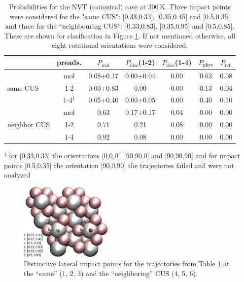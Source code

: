 \documentclass[11pt,DIV=13,BCOR=5mm,a4paper,headinclude]{scrbook}
\begin{document}
\begin{table}[hbt]
 \centering
  \caption{
  Probabilities for the NVT (canonical) case at $300\,$K.
Three impact points were considered for the "same CUS": [0.33,0.33], [0.35,0.45] and [0.5,0.35]  and three for the ``neighbouring CUS'': [0.33,0.83], [0.35,0.95] and [0.5,0.85].
These are shown for clarification in Figure \ref{fig:impact}.
If not mentioned otherwise, all eight rotational orientations were considered.}
 \begin{tabular}{l|c|ccccc}
\toprule
& preads. &$P_\textrm{mol}$ & $P_\textrm{diss}$(1-2) &  $P_\textrm{diss}$(1-4) & $P_\textrm{phys}$ & $P_\textrm{refl}$ \\\midrule
\multirow{3}{*}{same CUS}& mol &0.08+0.17 & 0.00+0.04 & 0.00 &  0.63 & 0.08 \\
& 1-2 &0.00+0.83 & 0.00 & 0.00 &  0.13 & 0.04 \\
& 1-4$^1$ &0.05+0.40 & 0.00+0.05 & 0.00 & 0.40 & 0.10 \\\midrule
\multirow{3}{*}{neighbor CUS}& mol &0.63 & 0.17+0.17 & 0.04  & 0.00 & 0.00 \\
& 1-2 & 0.71 & 0.21 & 0.08& 0.00 & 0.00\\
& 1-4 & 0.92 & 0.08 & 0.00 & 0.00 & 0.00\\\bottomrule
\end{tabular}
\begin{tablenotes}
 \footnotesize
\item[] $^1$ for [0.33,0.33] the orientations [0,0,0], [90,90,0] and [90,90,90] and for impact points [0.5,0.35] the orientation [90,0,90] the trajectories failed and were not analyzed
\end{tablenotes}
 \label{tab:enh_can}
\end{table}
\begin{figure}[!h]
 \centering
 \includegraphics[width=0.4\textwidth]{figures/0001/points_same_other.png}
 \caption{Distinctive lateral impact points for the trajectories from Table \ref{tab:enh_can} at the ``same'' (1, 2, 3) and the ``neighboring'' CUS (4, 5, 6).}
 \label{fig:impact}
 \end{figure}
\end{document}
